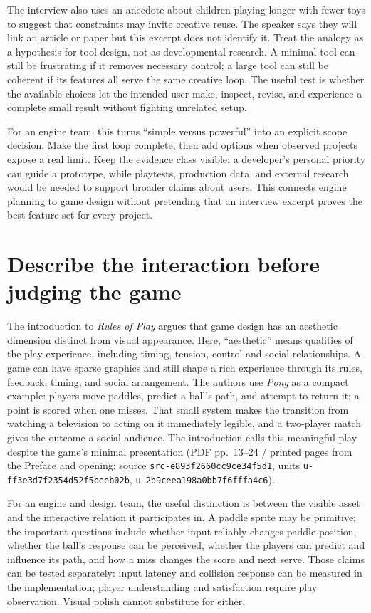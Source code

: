 The interview also uses an anecdote about children playing longer with fewer toys to suggest that constraints may invite creative reuse. The speaker says they will link an article or paper but this excerpt does not identify it. Treat the analogy as a hypothesis for tool design, not as developmental research. A minimal tool can still be frustrating if it removes necessary control; a large tool can still be coherent if its features all serve the same creative loop. The useful test is whether the available choices let the intended user make, inspect, revise, and experience a complete small result without fighting unrelated setup.

For an engine team, this turns ``simple versus powerful'' into an explicit scope decision. Make the first loop complete, then add options when observed projects expose a real limit. Keep the evidence class visible: a developer's personal priority can guide a prototype, while playtests, production data, and external research would be needed to support broader claims about users. This connects engine planning to game design without pretending that an interview excerpt proves the best feature set for every project.

\section{Describe the interaction before judging the game}\label{06-engine-ii-ch047-describe-the-interaction-before-judging-the-game}

The introduction to \emph{Rules of Play} argues that game design has an aesthetic dimension distinct from visual appearance. Here, ``aesthetic'' means qualities of the play experience, including timing, tension, control and social relationships. A game can have sparse graphics and still shape a rich experience through its rules, feedback, timing, and social arrangement. The authors use \emph{Pong} as a compact example: players move paddles, predict a ball's path, and attempt to return it; a point is scored when one misses. That small system makes the transition from watching a television to acting on it immediately legible, and a two-player match gives the outcome a social audience. The introduction calls this meaningful play despite the game's minimal presentation (PDF pp.~13--24 / printed pages from the Preface and opening; source \texttt{src-e893f2660cc9ce34f5d1}, units \texttt{u-ff3e3d7f2354d52f5beeb02b}, \texttt{u-2b9ceea198a0bb7f6fffa4c6}).

For an engine and design team, the useful distinction is between the visible asset and the interactive relation it participates in. A paddle sprite may be primitive; the important questions include whether input reliably changes paddle position, whether the ball's response can be perceived, whether the players can predict and influence its path, and how a miss changes the score and next serve. Those claims can be tested separately: input latency and collision response can be measured in the implementation; player understanding and satisfaction require play observation. Visual polish cannot substitute for either.

